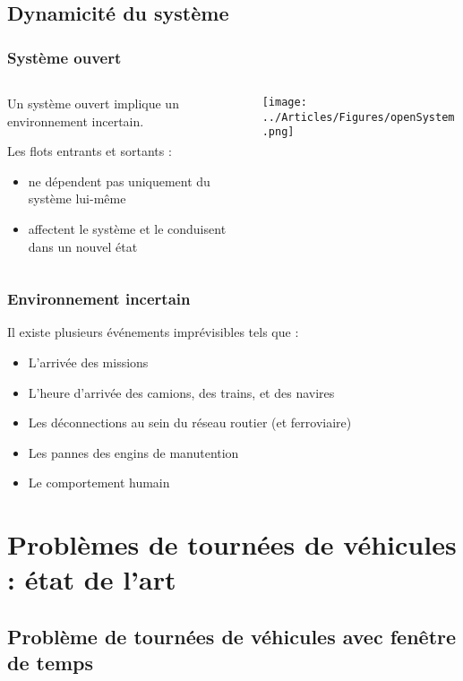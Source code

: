 \documentclass{beamer}
\begin{document}
\subsection*{Dynamicité du système}
\begin{frame}
\frametitle{Système ouvert}
	\begin{columns}
		\begin{column}[l]{8cm}
			Un système ouvert implique un environnement incertain.

			Les flots entrants et sortants : 
			\begin{itemize}
				\item ne dépendent pas uniquement du système lui-même
				\item affectent le système et le conduisent dans un nouvel état
			\end{itemize}
		\end{column}
		\begin{column}[r]{4cm}
			\begin{center}
				\texttt{[image: ../Articles/Figures/openSystem.png]}
			\end{center}
	 	\end{column}
	\end{columns}
\end{frame}
\begin{frame}
\frametitle{Environnement incertain}
	Il existe plusieurs événements imprévisibles tels que :
	  \begin{itemize}
	  \item L'arrivée des missions
	  \item L'heure d'arrivée des camions, des  trains, et des navires
	  \item Les déconnections au sein du réseau routier (et ferroviaire)
	  \item Les pannes des engins de manutention
	  \item Le comportement humain %
	\end{itemize}
\end{frame}


\section{Problèmes de tournées de véhicules : état de l'art}

\subsection*{Problème de tournées de véhicules avec fenêtre de temps}
\end{document}
